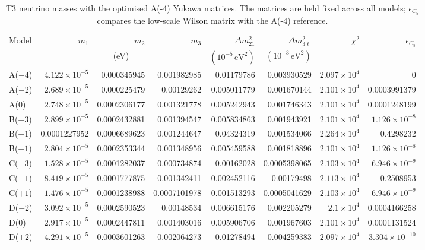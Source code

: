 \begin{table}[p]
\centering
\caption{T3 neutrino masses with the optimised A(-4) Yukawa matrices. The matrices are held fixed across all models; $\epsilon_{C_5}$ compares the low-scale Wilson matrix with the A(-4) reference.}
\label{tab:appC_Am4_masses}
\begingroup
\footnotesize
\setlength{\tabcolsep}{3.2pt}
\begin{tabular}{lrrrrrrr}
\hline
Model & $m_1$ & $m_2$ & $m_3$ & $\Delta m^2_{21}$ & $\Delta m^2_{3\ell}$ & $\chi^2$ & $\epsilon_{C_5}$ \\
 & \multicolumn{3}{c}{(eV)} & $(10^{-5}\,\mathrm{eV}^2)$ & $(10^{-3}\,\mathrm{eV}^2)$ &  &  \\
\hline
A($-4$) & $4.122\times10^{-5}$ & 0.000345945 & 0.001982985 & 0.01179786 & 0.003930529 & $2.097\times10^{4}$ & 0 \\
A($-2$) & $2.689\times10^{-5}$ & 0.000225479 & 0.00129262 & 0.005011779 & 0.001670144 & $2.101\times10^{4}$ & 0.0003991379 \\
A($0$) & $2.748\times10^{-5}$ & 0.0002306177 & 0.001321778 & 0.005242943 & 0.001746343 & $2.101\times10^{4}$ & 0.0001248199 \\
B($-3$) & $2.899\times10^{-5}$ & 0.0002432881 & 0.001394547 & 0.005834863 & 0.001943921 & $2.101\times10^{4}$ & $1.126\times10^{-8}$ \\
B($-1$) & 0.0001227952 & 0.0006689623 & 0.001244647 & 0.04324319 & 0.001534066 & $2.264\times10^{4}$ & 0.4298232 \\
B($+1$) & $2.804\times10^{-5}$ & 0.0002353344 & 0.001348956 & 0.005459588 & 0.001818896 & $2.101\times10^{4}$ & $1.126\times10^{-8}$ \\
C($-3$) & $1.528\times10^{-5}$ & 0.0001282037 & 0.000734874 & 0.00162028 & 0.0005398065 & $2.103\times10^{4}$ & $6.946\times10^{-9}$ \\
C($-1$) & $8.419\times10^{-5}$ & 0.0001777875 & 0.001342411 & 0.002452116 & 0.00179498 & $2.113\times10^{4}$ & 0.2508953 \\
C($+1$) & $1.476\times10^{-5}$ & 0.0001238988 & 0.0007101978 & 0.001513293 & 0.0005041629 & $2.103\times10^{4}$ & $6.946\times10^{-9}$ \\
D($-2$) & $3.092\times10^{-5}$ & 0.0002590523 & 0.00148534 & 0.006615176 & 0.002205279 & $2.1\times10^{4}$ & 0.0004166258 \\
D($0$) & $2.917\times10^{-5}$ & 0.0002447811 & 0.001403016 & 0.005906706 & 0.001967603 & $2.101\times10^{4}$ & 0.0001131524 \\
D($+2$) & $4.291\times10^{-5}$ & 0.0003601263 & 0.002064273 & 0.01278494 & 0.004259383 & $2.097\times10^{4}$ & $3.304\times10^{-10}$ \\

\end{tabular}
\end{table}
